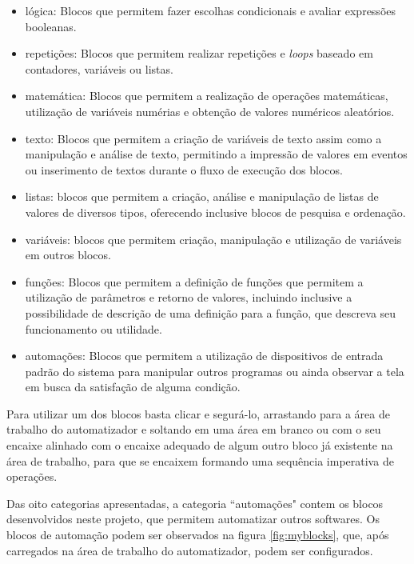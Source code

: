 \documentclass[tg]{mdtufsm}
\begin{document}
                \begin{itemize}
                    \item lógica: Blocos que permitem fazer escolhas condicionais e avaliar expressões booleanas.
                    \item repetições: Blocos que permitem realizar repetições e \emph{loops} baseado em contadores, variáveis ou listas.
                    \item matemática: Blocos que permitem a realização de operações matemáticas, utilização de variáveis numérias e obtenção de valores numéricos aleatórios.
                    \item texto: Blocos que permitem a criação de variáveis de texto assim como a manipulação e análise de texto, permitindo a impressão de valores em eventos ou inserimento de textos durante o fluxo de execução dos blocos.
                    \item listas: blocos que permitem a criação, análise e manipulação de listas de valores de diversos tipos, oferecendo inclusive blocos de pesquisa e ordenação.
                    \item variáveis: blocos que permitem criação, manipulação e utilização de variáveis em outros blocos.
                    \item funções: Blocos que permitem a definição de funções que permitem a utilização de parâmetros e retorno de valores, incluindo inclusive a possibilidade de descrição de uma definição para a função, que descreva seu funcionamento ou utilidade.
                    \item automações: Blocos que permitem a utilização de dispositivos de entrada padrão do sistema para manipular outros programas ou ainda observar a tela em busca da satisfação de alguma condição.
                \end{itemize}

                Para utilizar um dos blocos basta clicar e segurá-lo, arrastando para a área de trabalho do automatizador e soltando em uma área em branco ou com o seu encaixe alinhado com o encaixe adequado de algum outro bloco já existente na área de trabalho, para que se encaixem formando uma sequência imperativa de operações.

                Das oito categorias apresentadas, a categoria ``automações" contem os blocos desenvolvidos neste projeto, que permitem automatizar outros softwares. Os blocos de automação podem ser observados na figura \ref{fig:myblocks}, que, após carregados na área de trabalho do automatizador, podem ser configurados.
\end{document}
